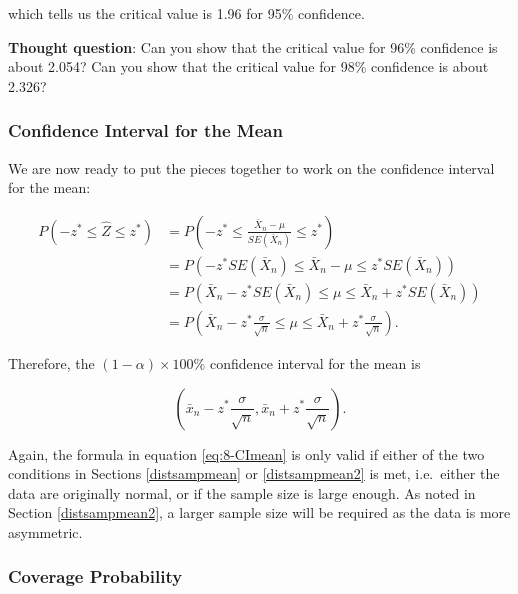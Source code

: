 \documentclass[
]{book}
\theoremstyle{definition}
\theoremstyle{definition}
\theoremstyle{definition}
\theoremstyle{definition}
\theoremstyle{remark}
\begin{document}
which tells us the critical value is 1.96 for 95\% confidence.

\textbf{Thought question}: Can you show that the critical value for 96\% confidence is about 2.054? Can you show that the critical value for 98\% confidence is about 2.326?

\hypertarget{confidence-interval-for-the-mean}{%
\subsubsection{Confidence Interval for the Mean}\label{confidence-interval-for-the-mean}}

We are now ready to put the pieces together to work on the confidence interval for the mean:

\begin{equation} 
\begin{split}
P(-z^{*} \leq \hat{Z} \leq z^{*}) &= P(-z^{*} \leq \frac{\bar{X}_n - \mu}{SE(\bar{X}_n)} \leq z^{*}) \\
                                  &= P\left(-z^{*}SE(\bar{X}_n) \leq \bar{X}_n - \mu \leq z^{*}SE(\bar{X}_n)\right) \\
                                  &= P\left(\bar{X}_n - z^{*}SE(\bar{X}_n) \leq \mu \leq \bar{X}_n + z^{*}SE(\bar{X}_n)\right) \\
                                  &= P\left(\bar{X}_n - z^{*} \frac{\sigma}{\sqrt{n}} \leq \mu \leq \bar{X}_n + z^{*} \frac{\sigma}{\sqrt{n}}\right).
\end{split}
\label{eq:8-CImeanwork}
\end{equation}

Therefore, the \((1-\alpha) \times 100\%\) confidence interval for the mean is

\begin{equation} 
\left( \bar{x}_n - z^{*} \frac{\sigma}{\sqrt{n}}, \bar{x}_n + z^{*} \frac{\sigma}{\sqrt{n}} \right).
\label{eq:8-CImean}
\end{equation}

Again, the formula in equation \eqref{eq:8-CImean} is only valid if either of the two conditions in Sections \ref{distsampmean} or \ref{distsampmean2} is met, i.e.~either the data are originally normal, or if the sample size is large enough. As noted in Section \ref{distsampmean2}, a larger sample size will be required as the data is more asymmetric.

\hypertarget{CP}{%
\subsubsection{Coverage Probability}\label{CP}}
\end{document}
